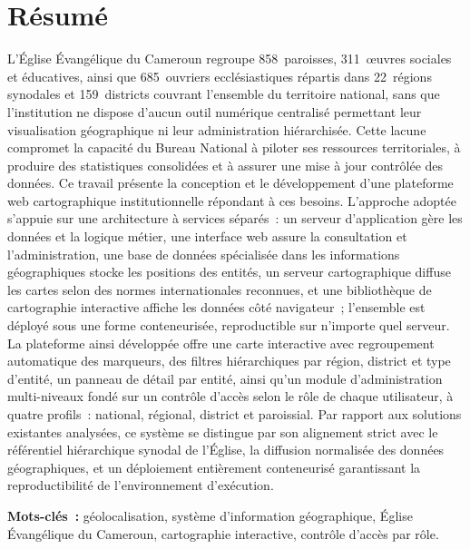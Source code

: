 \documentclass[12pt, a4paper]{report}
\begin{document}

\chapter*{Résumé}

\noindent
L'Église Évangélique du Cameroun regroupe 858~paroisses, 311~œuvres sociales
et éducatives, ainsi que 685~ouvriers ecclésiastiques répartis dans 22~régions
synodales et 159~districts couvrant l'ensemble du territoire national, sans
que l'institution ne dispose d'aucun outil numérique centralisé permettant
leur visualisation géographique ni leur administration hiérarchisée. Cette
lacune compromet la capacité du Bureau National à piloter ses ressources
territoriales, à produire des statistiques consolidées et à assurer une mise
à jour contrôlée des données. Ce travail présente la conception et le
développement d'une plateforme web cartographique institutionnelle répondant
à ces besoins. L'approche adoptée s'appuie sur une architecture à services
séparés~: un serveur d'application gère les données et la logique métier, une
interface web assure la consultation et l'administration, une base de données
spécialisée dans les informations géographiques stocke les positions des
entités, un serveur cartographique diffuse les cartes selon des normes
internationales reconnues, et une bibliothèque de cartographie interactive
affiche les données côté navigateur~; l'ensemble est déployé sous une forme
conteneurisée, reproductible sur n'importe quel serveur. La plateforme ainsi
développée offre une carte interactive avec regroupement automatique des
marqueurs, des filtres hiérarchiques par région, district et type d'entité,
un panneau de détail par entité, ainsi qu'un module d'administration
multi-niveaux fondé sur un contrôle d'accès selon le rôle de chaque
utilisateur, à quatre profils~: national, régional, district et paroissial.
Par rapport aux solutions existantes analysées, ce système se distingue par
son alignement strict avec le référentiel hiérarchique synodal de l'Église,
la diffusion normalisée des données géographiques, et un déploiement
entièrement conteneurisé garantissant la reproductibilité de l'environnement
d'exécution.

\smallskip
\noindent\textbf{Mots-clés~:}
géolocalisation, système d'information géographique, Église Évangélique du
Cameroun, cartographie interactive, contrôle d'accès par rôle.
\end{document}
